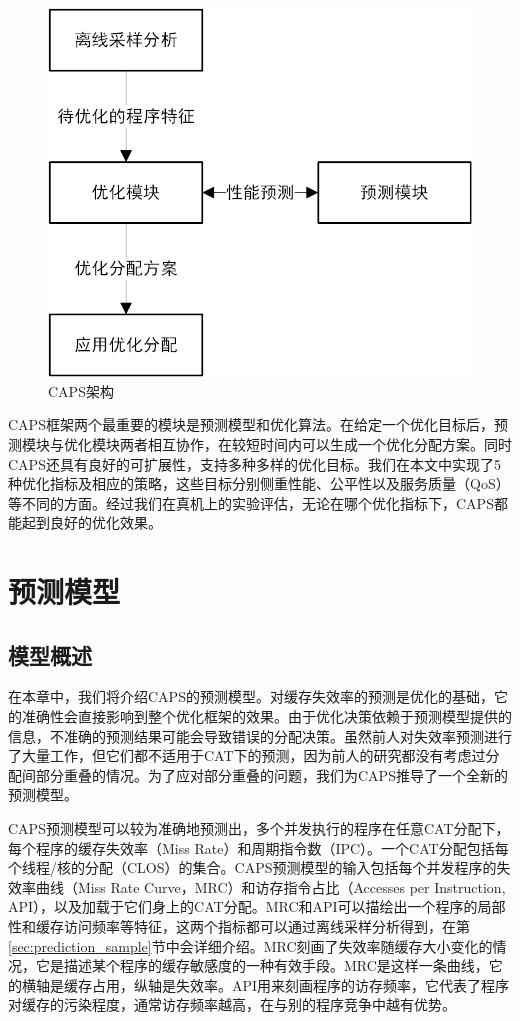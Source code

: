 \begin{figure}[htbp] 
    \centering
    \includegraphics[width=0.6\linewidth]{figures/caps_overview.png}
    \caption{CAPS架构}
    \label{fig:caps_overview}
\end{figure}

CAPS框架两个最重要的模块是预测模型和优化算法。在给定一个优化目标后，预测模块与优化模块两者相互协作，在较短时间内可以生成一个优化分配方案。同时CAPS还具有良好的可扩展性，支持多种多样的优化目标。我们在本文中实现了5种优化指标及相应的策略，这些目标分别侧重性能、公平性以及服务质量（QoS）等不同的方面。经过我们在真机上的实验评估，无论在哪个优化指标下，CAPS都能起到良好的优化效果。

\section{预测模型} \label{sec:prediction}
\subsection{模型概述}
在本章中，我们将介绍CAPS的预测模型。对缓存失效率的预测是优化的基础，它的准确性会直接影响到整个优化框架的效果。由于优化决策依赖于预测模型提供的信息，不准确的预测结果可能会导致错误的分配决策。虽然前人对失效率预测进行了大量工作，但它们都不适用于CAT下的预测，因为前人的研究都没有考虑过分配间部分重叠的情况。为了应对部分重叠的问题，我们为CAPS推导了一个全新的预测模型。

CAPS预测模型可以较为准确地预测出，多个并发执行的程序在任意CAT分配下，每个程序的缓存失效率（Miss Rate）和周期指令数（IPC）。一个CAT分配包括每个线程/核的分配（CLOS）的集合。CAPS预测模型的输入包括每个并发程序的失效率曲线（Miss Rate Curve，MRC）和访存指令占比（Accesses per Instruction, API），以及加载于它们身上的CAT分配。MRC和API可以描绘出一个程序的局部性和缓存访问频率等特征，这两个指标都可以通过离线采样分析得到，在第\ref{sec:prediction_sample}节中会详细介绍。MRC刻画了失效率随缓存大小变化的情况，它是描述某个程序的缓存敏感度的一种有效手段。MRC是这样一条曲线，它的横轴是缓存占用，纵轴是失效率。API用来刻画程序的访存频率，它代表了程序对缓存的污染程度，通常访存频率越高，在与别的程序竞争中越有优势。

